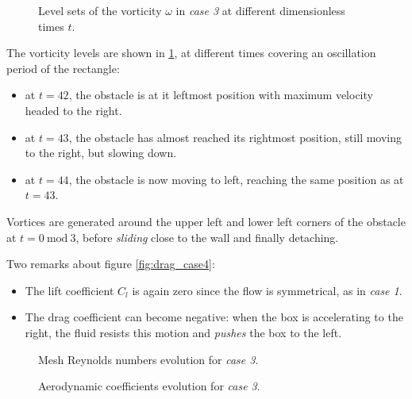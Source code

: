 \documentclass[11 pt]{article}
\begin{document}
\begin{figure}[H]
    \centering
    
    \caption{Level sets of the vorticity $\omega$ in \textit{case 3} at different dimensionless times $t$.}
    \label{fig:vorticity_3}
\end{figure}

The vorticity levels are shown in \ref{fig:vorticity_3}, at different times covering an oscillation period of the rectangle:
\begin{itemize}
    \item at $t=42$, the obstacle is at it leftmost position with maximum velocity headed to the right.
    \item at $t=43$, the obstacle has almost reached its rightmost position, still moving to the right, but slowing down.
    \item at $t=44$, the obstacle is now moving to left, reaching the same position as at $t=43$.
\end{itemize}

Vortices are generated around the upper left and lower left corners of the obstacle at $t=0 \: \textrm{mod} \: 3$, before \textit{sliding} close to the wall and finally detaching.

Two remarks about figure \ref{fig:drag_case4}:
\begin{itemize}
    \item The lift coefficient $C_l$ is again zero since the flow is symmetrical, as in \textit{case 1}.
    \item The drag coefficient can become negative: when the box is accelerating to the right, the fluid resists this motion and \textit{pushes} the box to the left.
\end{itemize}

\begin{figure}[H]
    \centering
    
    \caption{Mesh Reynolds numbers evolution for \textit{case 3}.}
    \label{fig:mesh_re_case3}
\end{figure}


\begin{figure}[H]
    \centering
    
    \caption{Aerodynamic coefficients evolution for \textit{case 3}.}
    \label{fig:drag_case3}
\end{figure}
\end{document}
